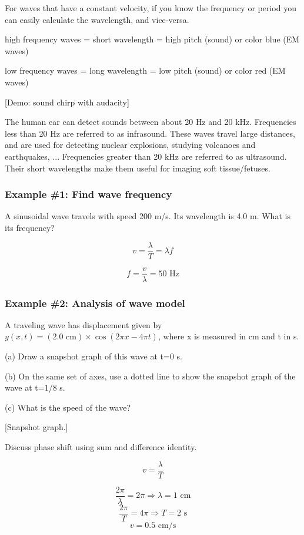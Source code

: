 For waves that have a constant velocity, if you know the frequency or period you can easily calculate the wavelength, and vice-versa.

high frequency waves = short wavelength = high pitch (sound) or color blue (EM waves)

low frequency waves = long wavelength = low pitch (sound) or color red (EM waves)

[Demo: sound chirp with audacity]

The human ear can detect sounds between about 20 Hz and 20 kHz. Frequencies less than 20 Hz are referred to as infrasound. These waves travel large distances, and are used for detecting nuclear explosions, studying volcanoes and earthquakes, ... Frequencies greater than 20 kHz are referred to as ultrasound. Their short wavelengths make them useful for imaging soft tissue/fetuses.

\subsubsection{Example \#1: Find wave frequency}
A sinusoidal wave travels with speed 200 m/s. Its wavelength is 4.0 m. What is its frequency? 

$$v=\frac{\lambda}{T}=\lambda f$$

$$f = \frac{v}{\lambda} = 50\mbox{ Hz}$$


\subsubsection{Example \#2: Analysis of wave model}
A traveling wave has displacement given by $y(x,t)=(2.0\mbox{ cm})\times\cos(2\pi x-4\pi t)$, where x is measured in cm and t in s.

(a) Draw a snapshot graph of this wave at t=0 s.

(b) On the same set of axes, use a dotted line to show the snapshot graph of the wave at t=1/8 s.

(c) What is the speed of the wave?

[Snapshot graph.]\nopagebreak
\vspace{5cm}

Discuss phase shift using sum and difference identity.

$$v=\frac{\lambda}{T}$$

$$\frac{2\pi}{\lambda}=2\pi \Rightarrow \lambda=1\mbox{ cm}$$
$$\frac{2\pi}{T}=4\pi \Rightarrow T = 2\mbox{ s}$$
$$\boxed{v=0.5\mbox{ cm/s}}$$




